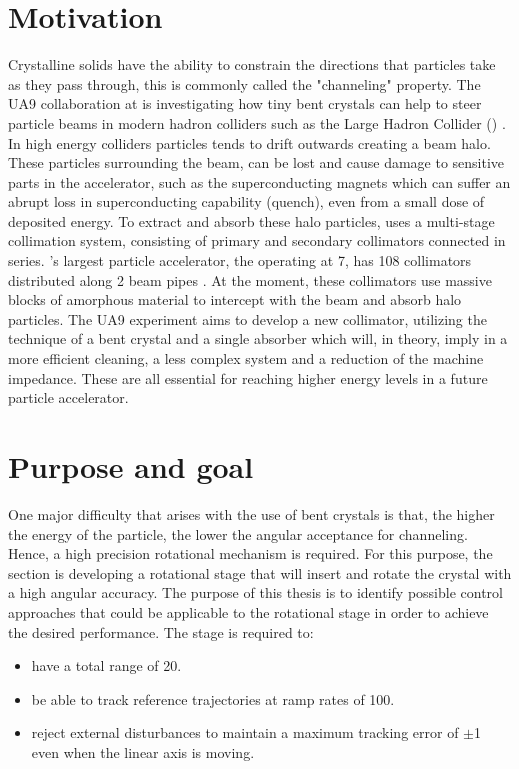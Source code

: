 \section{Motivation}
Crystalline solids have the ability to constrain the directions that particles take as they pass through, this is commonly called the "channeling" property. The UA9 collaboration at \abbrCERN is investigating how tiny bent crystals can help to steer particle beams in modern hadron colliders such as the Large Hadron Collider (\abbrLHC) \citep{WebsiteUA9:2016}. In high energy colliders particles tends to drift outwards creating a beam halo. These particles surrounding the beam, can be lost and cause damage to sensitive parts in the accelerator, such as the superconducting magnets which can suffer an abrupt loss in superconducting capability (quench), even from a small dose of deposited energy. To extract and absorb these halo particles, \abbrCERN uses a multi-stage collimation system, consisting of primary and secondary collimators connected in series. \abbrCERN's largest particle accelerator, the \abbrLHC operating at \unit{7}{\tera\electronvolt}, has 108 collimators distributed along 2 beam pipes \citep{CrystalCollimation:2015}. At the moment, these collimators use massive blocks of amorphous material to intercept with the beam and absorb halo particles. The UA9 experiment aims to develop a new collimator, utilizing the technique of a bent crystal and a single absorber which will, in theory, imply in a more efficient cleaning, a less complex system and a reduction of the machine impedance. These are all essential for reaching higher energy levels in a future particle accelerator.

\section{Purpose and goal}
One major difficulty that arises with the use of bent crystals is that, the higher the energy of the particle, the lower the angular acceptance for channeling. Hence, a high precision rotational mechanism is required. For this purpose, the \abbrECE section is developing a rotational stage that will insert and rotate the crystal with a high angular accuracy. The purpose of this thesis is to identify possible control approaches that could be applicable to the rotational stage in order to achieve the desired performance. The stage is required to:
\begin{itemize}
  \item have a total range of \unit{20}{\milli\rad}.
  \item be able to track reference trajectories at ramp rates of \unit{100}{\micro\radianpersecond}.
  \item reject external disturbances to maintain a maximum tracking error of $\pm$\unit{1}{\micro\rad} even when the linear axis is moving.
\end{itemize}

